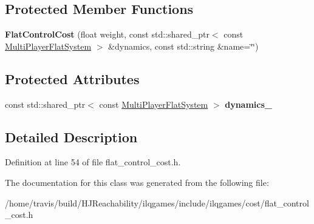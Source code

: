 \subsection*{Protected Member Functions}
\begin{DoxyCompactItemize}
\item 
{\bfseries Flat\+Control\+Cost} (float weight, const std\+::shared\+\_\+ptr$<$ const \hyperlink{classilqgames_1_1_multi_player_flat_system}{Multi\+Player\+Flat\+System} $>$ \&dynamics, const std\+::string \&name=\char`\"{}\char`\"{})\hypertarget{classilqgames_1_1_flat_control_cost_a17be159f97c955c3dd6e7308daa2bcc2}{}\label{classilqgames_1_1_flat_control_cost_a17be159f97c955c3dd6e7308daa2bcc2}

\end{DoxyCompactItemize}
\subsection*{Protected Attributes}
\begin{DoxyCompactItemize}
\item 
const std\+::shared\+\_\+ptr$<$ const \hyperlink{classilqgames_1_1_multi_player_flat_system}{Multi\+Player\+Flat\+System} $>$ {\bfseries dynamics\+\_\+}\hypertarget{classilqgames_1_1_flat_control_cost_ab7a34cd3a2851e1f9aeee9ed2484a4ec}{}\label{classilqgames_1_1_flat_control_cost_ab7a34cd3a2851e1f9aeee9ed2484a4ec}

\end{DoxyCompactItemize}


\subsection{Detailed Description}


Definition at line 54 of file flat\+\_\+control\+\_\+cost.\+h.



The documentation for this class was generated from the following file\+:\begin{DoxyCompactItemize}
\item 
/home/travis/build/\+H\+J\+Reachability/ilqgames/include/ilqgames/cost/flat\+\_\+control\+\_\+cost.\+h\end{DoxyCompactItemize}
